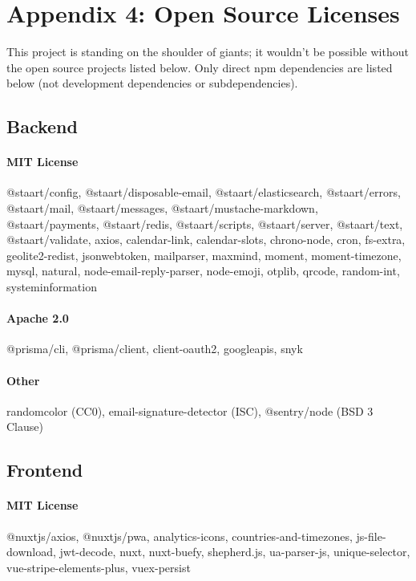 \documentclass{article}
\begin{document}
\newpage

\section*{Appendix 4: Open Source Licenses}

This project is standing on the shoulder of giants; it wouldn't be possible without the open source projects listed below. Only direct npm dependencies are listed below (not development dependencies or subdependencies).

\subsection*{Backend}

\paragraph{MIT License} @staart/config, @staart/disposable-email, @staart/elasticsearch, @staart/errors, @staart/mail, @staart/messages, @staart/mustache-markdown, @staart/payments, @staart/redis, @staart/scripts, @staart/server, @staart/text, @staart/validate, axios, calendar-link, calendar-slots, chrono-node, cron, fs-extra, geolite2-redist, jsonwebtoken, mailparser, maxmind, moment, moment-timezone, mysql, natural, node-email-reply-parser, node-emoji, otplib, qrcode, random-int, systeminformation

\paragraph{Apache 2.0} @prisma/cli, @prisma/client, client-oauth2, googleapis, snyk

\paragraph{Other} randomcolor (CC0), email-signature-detector (ISC), @sentry/node (BSD 3 Clause)

\subsection*{Frontend}

\paragraph{MIT License} @nuxtjs/axios, @nuxtjs/pwa, analytics-icons, countries-and-timezones, js-file-download, jwt-decode, nuxt, nuxt-buefy, shepherd.js, ua-parser-js, unique-selector, vue-stripe-elements-plus, vuex-persist
\end{document}
